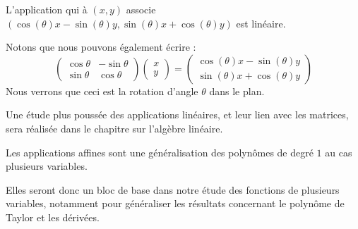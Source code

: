 \begin{frame}
  \begin{example}
    L'application qui à \((x,y)\) associe \((\cos(\theta)x - \sin(\theta) y, \sin(\theta)x + \cos(\theta)y)\) est linéaire.\pause{}

    Notons que nous pouvons également écrire :\pause{}
    \begin{equation*}
      \begin{pmatrix}
        \cos\theta & -\sin\theta\\
        \sin\theta & \cos\theta
      \end{pmatrix}
      \begin{pmatrix}
        x\\y
      \end{pmatrix}
      =
      \begin{pmatrix}
        \cos(\theta)x - \sin(\theta) y\\
        \sin(\theta)x + \cos(\theta)y
      \end{pmatrix}
    \end{equation*}\pause{}
    Nous verrons que ceci est la rotation d'angle \(\theta\) dans le plan.
  \end{example}\pause{}
  \begin{remark*}
    Une étude plus poussée des applications linéaires, et leur lien avec les matrices, sera réalisée dans le chapitre sur l'algèbre linéaire.\pause{}
  \end{remark*}
  \begin{remark*}
    Les applications affines sont une généralisation des polynômes de degré \(1\) au cas \og plusieurs variables\fg{}. \pause{}

Elles seront donc un bloc de base dans notre étude des fonctions de plusieurs variables,\pause{} notamment pour généraliser les résultats concernant le polynôme de Taylor\pause{} et les dérivées.
  \end{remark*}
\end{frame}


